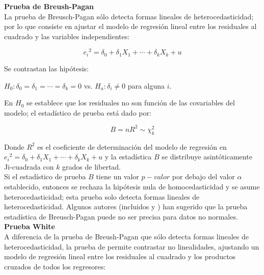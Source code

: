 \textbf{Prueba de Breush-Pagan} ~\parencites{breush-1979, verbeek-2004}\\

La prueba de Breusch-Pagan sólo detecta formas lineales de heterocedasticidad; por lo que consiste en ajustar el modelo de regresión lineal entre los residuales al cuadrado y las variables independientes:

\begin{center}
	$${e_i} ^2=\delta _0 + \delta _1 X_1+ \cdots + \delta _k X_k  + u$$
\end{center}

Se contrastan las hipótesis:\\

\begin{center}
	$H_0: \delta _0 = \delta _1 = \cdots =\delta _k=0 $  vs.  $H_a: \delta_i \neq 0$ para alguna $i$.
\end{center}


En $H_0$ se establece que los residuales no son función de las covariables del modelo; el estadístico de prueba está dado por:


\begin{center}
	$$B=n R ^2 \sim \chi_k ^2$$
\end{center}


Donde $R^2$ es el coeficiente de determinación del modelo de regresión en ${e_i} ^2=\delta _0 + \delta _1 X_1+ \cdots + \delta _k X_k  + u$ y la estadística $B$ se distribuye asintóticamente Ji-cuadrada con $k$ grados de libertad.\\

Si el estadístico de prueba $B$ tiene un valor $p-valor$  por debajo del valor $\alpha$ establecido, entonces se rechaza la hipótesis nula de homocedasticidad y se asume heterocedasticidad; esta prueba solo detecta formas lineales de heterocedasticidad. Algunos autores (incluidos \textcite{bickel-1978} y \textcite{koenker-1981}) han sugerido que la prueba estadística de Breusch-Pagan puede no ser precisa para datos no normales.\\


\textbf{Prueba White} ~\parencite{verbeek-2004} \\

A diferencia de la prueba de Breush-Pagan que sólo detecta formas lineales de heterocedasticidad, la prueba de \textcite{white-1980} permite contrastar no linealidades, ajustando un modelo de regresión lineal entre los residuales al cuadrado y los productos cruzados de todos los regresores:


